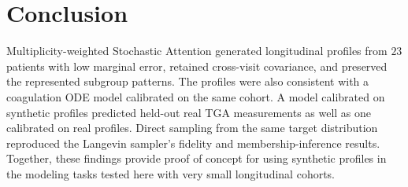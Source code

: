 \section{Conclusion}
\label{sec:conclusion}

Multiplicity-weighted Stochastic Attention generated longitudinal profiles from $23$ patients
with low marginal error, retained cross-visit covariance, and preserved the represented
subgroup patterns. The profiles were also consistent with a coagulation ODE model
calibrated on the same cohort. A model calibrated on synthetic profiles predicted held-out
real TGA measurements as well as one calibrated on real profiles. Direct sampling from
the same target distribution reproduced the Langevin sampler's fidelity and
membership-inference results. Together, these findings provide proof of concept for
using synthetic profiles in the modeling tasks tested here with very small longitudinal
cohorts.
